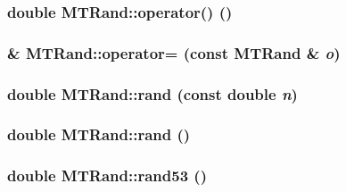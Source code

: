 \begin{CompactItemize}
\begin{CompactItemize}
{\subsubsection[{operator()}]{\setlength{\rightskip}{0pt plus 5cm}double MTRand::operator() ()}}
\label{classMTRand_bbb87a08d622d58fdee0eea4cb5471a0}


\hypertarget{classMTRand_3a6eb21add6f6ef4ce2d3280f2518521}{
\subsubsection[{operator=}]{ \& MTRand::operator= (const {\bf MTRand} \& {\em o})}}
\label{classMTRand_3a6eb21add6f6ef4ce2d3280f2518521}


\hypertarget{classMTRand_a4fe82fc27fd81414ce7554093a9766b}{
\subsubsection[{rand}]{\setlength{\rightskip}{0pt plus 5cm}double MTRand::rand (const double {\em n})}}
\label{classMTRand_a4fe82fc27fd81414ce7554093a9766b}


\hypertarget{classMTRand_76d129a2d850c24ff4a0613f299cf3a5}{
\subsubsection[{rand}]{\setlength{\rightskip}{0pt plus 5cm}double MTRand::rand ()}}
\label{classMTRand_76d129a2d850c24ff4a0613f299cf3a5}


\hypertarget{classMTRand_15f4daf79febbe4ff43c3e6ce2c4fcbe}{
\subsubsection[{rand53}]{\setlength{\rightskip}{0pt plus 5cm}double MTRand::rand53 ()}}
\label{classMTRand_15f4daf79febbe4ff43c3e6ce2c4fcbe}



\end{CompactItemize}
\end{CompactItemize}
